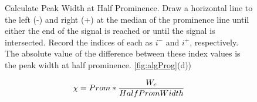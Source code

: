 \begin{figure}
\begin{algorithm}[H]
\DontPrintSemicolon
{}
\caption{\label{alg:width}Calculate Peak Width at Half Prominence. Draw a horizontal line to the left (-) and right (+) at the median of the prominence line until either the end of the signal is reached or until the signal is intersected. Record the indices of each as $i^{-}$ and $i^{+}$, respectively. The absolute value of the difference between these index values is the peak width at half prominence. \ref{fig:algProg}(d))}
\end{algorithm}
\end{figure}

\begin{equation}
\label{eqn:ratio}
\hfill \chi=Prom*\frac{W_c}{HalfPromWidth}\hfill
\end{equation}

